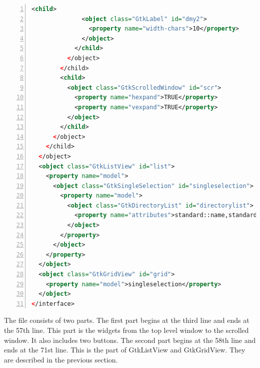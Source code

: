 \begin{lstlisting}[language=XML, numbers=left]
            <child>
              <object class="GtkLabel" id="dmy2">
                <property name="width-chars">10</property>
              </object>
            </child>
          </object>
        </child>
        <child>
          <object class="GtkScrolledWindow" id="scr">
            <property name="hexpand">TRUE</property>
            <property name="vexpand">TRUE</property>
          </object>
        </child>
      </object>
    </child>
  </object>
  <object class="GtkListView" id="list">
    <property name="model">
      <object class="GtkSingleSelection" id="singleselection">
        <property name="model">
          <object class="GtkDirectoryList" id="directorylist">
            <property name="attributes">standard::name,standard::icon,standard::content-type</property>
          </object>
        </property>
      </object>
    </property>
  </object>
  <object class="GtkGridView" id="grid">
    <property name="model">singleselection</property>
  </object>
</interface>
\end{lstlisting}

The file consists of two parts. The first part begins at the third line
and ends at the 57th line. This part is the widgets from the top level
window to the scrolled window. It also includes two buttons. The second
part begins at the 58th line and ends at the 71st line. This is the part
of GtkListView and GtkGridView. They are described in the previous
section.

